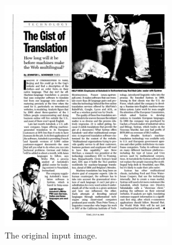 \begin{figure}[p]
\centering
\begin{subfigure}{0.30\textwidth}
\includegraphics[width=\linewidth]{img/tabStopDetection/tessPageSegm1.png}
\caption{The original input image.}
\label{fig:segmentationTesseract1}
\end{subfigure}
\quad
\begin{subfigure}{0.30\textwidth}

\end{subfigure}
\end{figure}
